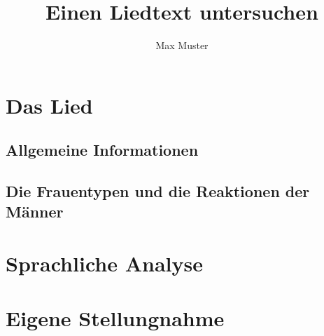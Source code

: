 \documentclass[12pt,a4paper]{scrartcl}
\begin{document}
 
\author{Max Muster} 
\title{Einen Liedtext untersuchen} 
\maketitle 


\section{Das Lied} 
\subsection{Allgemeine Informationen}
\begin{spacing}{2}


\subsection{Die Frauentypen und die Reaktionen der Männer}

\section{Sprachliche Analyse}


\section{Eigene Stellungnahme} 
 
\end{spacing}
\end{document}
